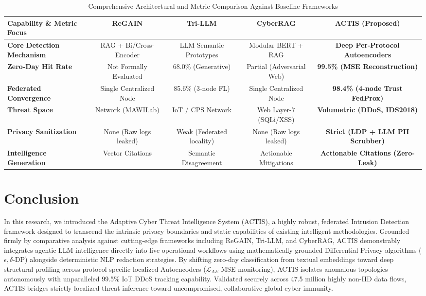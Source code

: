 \documentclass[conference]{IEEEtran}
\begin{document}
\begin{table}[htbp]
\centering
\caption{Comprehensive Architectural and Metric Comparison Against Baseline Frameworks}
\begin{tabularx}{\textwidth}{@{}l|c|c|c|c@{}}
\toprule
\textbf{Capability \& Metric Focus} & \textbf{ReGAIN \cite{ref2ReGAIN}} & \textbf{Tri-LLM \cite{ref1TriLLM}} & \textbf{CyberRAG \cite{ref3CyberRAG}} & \textbf{ACTIS (Proposed)} \\ \midrule
\textbf{Core Detection Mechanism} & RAG + Bi/Cross-Encoder & LLM Semantic Prototypes & Modular BERT + RAG & \textbf{Deep Per-Protocol Autoencoders} \\
\textbf{Zero-Day Hit Rate} & Not Formally Evaluated & 68.0\% (Generative) & Partial (Adversarial Web) & \textbf{99.5\% (MSE Reconstruction)} \\
\textbf{Federated Convergence} & Single Centralized Node & 85.6\% (3-node FL) & Single Centralized Node & \textbf{98.4\% (4-node Trust FedProx)} \\
\textbf{Threat Space} & Network (MAWILab) & IoT / CPS Network & Web Layer-7 (SQLi/XSS) & \textbf{Volumetric (DDoS, IDS2018)} \\
\textbf{Privacy Sanitization} & None (Raw logs leaked) & Weak (Federated locality) & None (Raw logs leaked) & \textbf{Strict (LDP + LLM PII Scrubber)} \\
\textbf{Intelligence Generation} & Vector Citations & Semantic Disagreement & Actionable Mitigations & \textbf{Actionable Citations (Zero-Leak)} \\ \bottomrule
\end{tabularx}
\label{tab:master_comparison}
\end{table}


\section{Conclusion}
In this research, we introduced the Adaptive Cyber Threat Intelligence System (ACTIS), a highly robust, federated Intrusion Detection framework designed to transcend the intrinsic privacy boundaries and static capabilities of existing intelligent methodologies. Grounded firmly by comparative analysis against cutting-edge frameworks including ReGAIN, Tri-LLM, and CyberRAG, ACTIS demonstrably integrates agentic LLM intelligence directly into live operational workflows using mathematically grounded Differential Privacy algorithms ($\epsilon, \delta$-DP) alongside deterministic NLP redaction strategies. By shifting zero-day classification from textual embeddings toward deep structural profiling across protocol-specific localized Autoencoders ($\mathcal{L}_{AE}$ MSE monitoring), ACTIS isolates anomalous topologies autonomously with unparalleled 99.5\% IoT DDoS tracking capability. Validated securely across 47.5 million highly non-IID data flows, ACTIS bridges strictly localized threat inference toward uncompromised, collaborative global cyber immunity.
\end{document}
